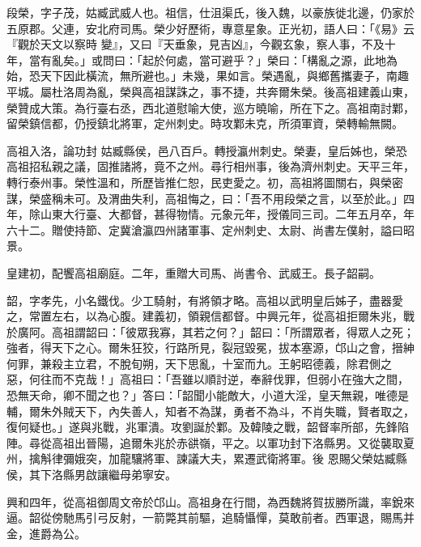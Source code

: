 
\begin{pinyinscope}

 段榮，字子茂，姑臧武威人也。祖信，仕沮渠氏，後入魏，以豪族徙北邊，仍家於五原郡。父連，安北府司馬。榮少好歷術，專意星象。正光初，語人曰：「《易》云『觀於天文以察時
 變』，又曰『天垂象，見吉凶』，今觀玄象，察人事，不及十年，當有亂矣。」或問曰：「起於何處，當可避乎？」榮曰：「構亂之源，此地為始，恐天下因此橫流，無所避也。」未幾，果如言。榮遇亂，與鄉舊攜妻子，南趣平城。屬杜洛周為亂，榮與高祖謀誅之，事不捷，共奔爾朱榮。後高祖建義山東，榮贊成大策。為行臺右丞，西北道慰喻大使，巡方曉喻，所在下之。高祖南討鄴，留榮鎮信都，仍授鎮北將軍，定州刺史。時攻鄴未克，所須軍資，榮轉輸無闕。



 高祖入洛，論功封
 姑臧縣侯，邑八百戶。轉授瀛州刺史。榮妻，皇后姊也，榮恐高祖招私親之議，固推諸將，竟不之州。尋行相州事，後為濟州刺史。天平三年，轉行泰州事。榮性溫和，所歷皆推仁恕，民吏愛之。初，高祖將圖關右，與榮密謀，榮盛稱未可。及渭曲失利，高祖悔之，曰：「吾不用段榮之言，以至於此。」四年，除山東大行臺、大都督，甚得物情。元象元年，授儀同三司。二年五月卒，年六十二。贈使持節、定冀滄瀛四州諸軍事、定州刺史、太尉、尚書左僕射，謚曰昭
 景。



 皇建初，配饗高祖廟庭。二年，重贈大司馬、尚書令、武威王。長子韶嗣。



 韶，字孝先，小名鐵伐。少工騎射，有將領才略。高祖以武明皇后姊子，盡器愛之，常置左右，以為心腹。建義初，領親信都督。中興元年，從高祖拒爾朱兆，戰於廣阿。高祖謂韶曰：「彼眾我寡，其若之何？」韶曰：「所謂眾者，得眾人之死；強者，得天下之心。爾朱狂狡，行路所見，裂冠毀冕，拔本塞源，邙山之會，搢紳何罪，兼殺主立君，不脫旬朔，天下思亂，十室而九。王躬昭德義，除君側之
 惡，何往而不克哉！」高祖曰：「吾雖以順討逆，奉辭伐罪，但弱小在強大之間，恐無天命，卿不聞之也？」答曰：「韶聞小能敵大，小道大淫，皇天無親，唯德是輔，爾朱外賊天下，內失善人，知者不為謀，勇者不為斗，不肖失職，賢者取之，復何疑也。」遂與兆戰，兆軍潰。攻劉誕於鄴。及韓陵之戰，韶督率所部，先鋒陷陣。尋從高祖出晉陽，追爾朱兆於赤谼嶺，平之。以軍功封下洛縣男。又從襲取夏州，擒斛律彌娥突，加龍驤將軍、諫議大夫，累遷武衛將軍。後
 恩賜父榮姑臧縣侯，其下洛縣男啟讓繼母弟寧安。



 興和四年，從高祖御周文帝於邙山。高祖身在行間，為西魏將賀拔勝所識，率銳來逼。韶從傍馳馬引弓反射，一箭斃其前驅，追騎懾憚，莫敢前者。西軍退，賜馬并金，進爵為公。




\end{pinyinscope}
